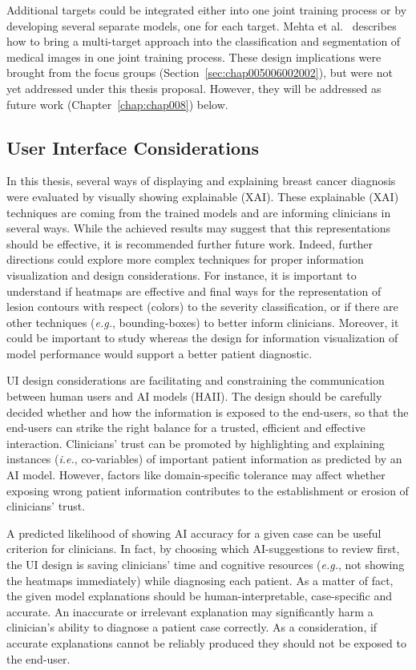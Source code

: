 Additional targets could be integrated either into one joint training process or by developing several separate models, one for each target.
Mehta et al.~\cite{10.1007/978-3-030-00934-2_99} describes how to bring a multi-target approach into the classification and segmentation of medical images in one joint training process.
These design implications were brought from the focus groups (Section~\ref{sec:chap005006002002}), but were not yet addressed under this thesis proposal.
However, they will be addressed as future work (Chapter~\ref{chap:chap008}) below.

\subsection{User Interface Considerations}
\label{sec:chap007004003}

In this thesis, several ways of displaying and explaining breast cancer diagnosis were evaluated by visually showing explainable (\ac{XAI}).
These explainable (\ac{XAI}) techniques are coming from the trained models and are informing clinicians in several ways.
While the achieved results may suggest that this representations should be effective, it is recommended further future work.
Indeed, further directions could explore more complex techniques for proper information visualization and design considerations.
For instance, it is important to understand if heatmaps are effective and final ways for the representation of lesion contours with respect (colors) to the severity classification, or if there are other techniques ({\it e.g.}, bounding-boxes) to better inform clinicians.
Moreover, it could be important to study whereas the design for information visualization of model performance would support a better patient diagnostic.

\ac{UI} design considerations are facilitating and constraining the communication between human users and \ac{AI} models (\ac{HAII}).
The design should be carefully decided whether and how the information is exposed to the end-users, so that the end-users can strike the right balance for a trusted, efficient and effective interaction.
Clinicians' trust can be promoted by highlighting and explaining instances ({\it i.e.}, co-variables) of important patient information as predicted by an \ac{AI} model.
However, factors like domain-specific tolerance may affect whether exposing wrong patient information contributes to the establishment or erosion of clinicians' trust.

A predicted likelihood of showing \ac{AI} accuracy for a given case can be useful criterion for clinicians.
In fact, by choosing which \ac{AI}-suggestions to review first, the \ac{UI} design is saving clinicians' time and cognitive resources ({\it e.g.}, not showing the heatmaps immediately) while diagnosing each patient.
As a matter of fact, the given model explanations should be human-interpretable, case-specific and accurate.
An inaccurate or irrelevant explanation may significantly harm a clinician's ability to diagnose a patient case correctly.
As a consideration, if accurate explanations cannot be reliably produced they should not be exposed to the end-user.

